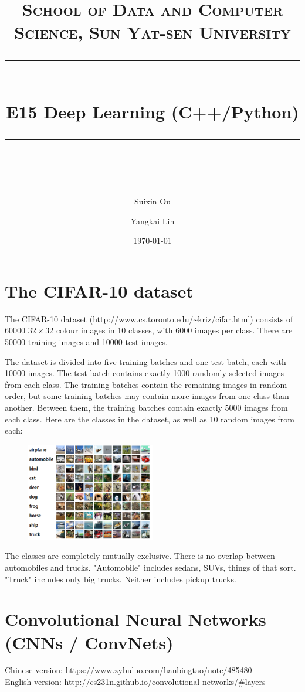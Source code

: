 \documentclass[UTF8, a4paper, 11pt]{article}
\title{	
\normalfont \normalsize
\textsc{School of Data and Computer Science, Sun Yat-sen University} \\ [25pt] %
\rule{\textwidth}{0.5pt} \\[0.4cm] %
\huge  E15 Deep Learning (C++/Python)\\ %
\rule{\textwidth}{2pt} \\[0.5cm] %
\author{Suixin Ou \and Yangkai Lin}
\date{\normalsize\today}
}
\begin{document}
\maketitle
\tableofcontents
\newpage
\section{The CIFAR-10 dataset}
The CIFAR-10 dataset (\url{http://www.cs.toronto.edu/~kriz/cifar.html}) consists of 60000 $32\times 32$ colour images in 10 classes, with 6000 images per class. There are 50000 training images and 10000 test images. 

The dataset is divided into five training batches and one test batch, each with 10000 images. The test batch contains exactly 1000 randomly-selected images from each class. The training batches contain the remaining images in random order, but some training batches may contain more images from one class than another. Between them, the training batches contain exactly 5000 images from each class. Here are the classes in the dataset, as well as 10 random images from each:
\begin{figure}[ht]
\centering
\includegraphics[width=0.5\textwidth]{Pic/cifar}
\end{figure}

The classes are completely mutually exclusive. There is no overlap between automobiles and trucks. "Automobile" includes sedans, SUVs, things of that sort. "Truck" includes only big trucks. Neither includes pickup trucks.
\section{Convolutional Neural Networks (CNNs / ConvNets)}
Chinese version: \url{https://www.zybuluo.com/hanbingtao/note/485480}\\
English version: \url{http://cs231n.github.io/convolutional-networks/#layers}
\end{document}
